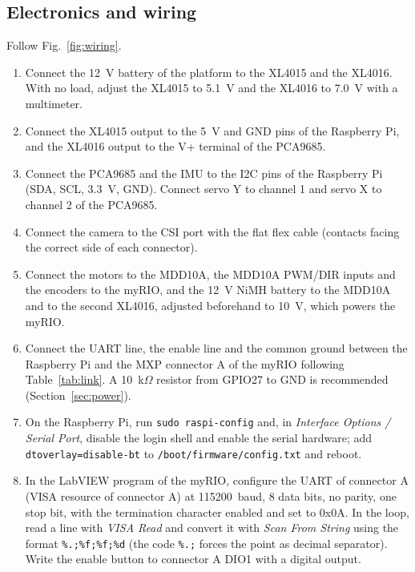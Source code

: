 \documentclass[11pt,letterpaper]{article}
\begin{document}
\subsection{Electronics and wiring}
Follow Fig.~\ref{fig:wiring}.
\begin{enumerate}
    \item Connect the 12~V battery of the platform to the XL4015 and the
    XL4016. With no load, adjust the XL4015 to 5.1~V and the XL4016 to
    7.0~V with a multimeter.
    \item Connect the XL4015 output to the 5~V and GND pins of the
    Raspberry Pi, and the XL4016 output to the V+ terminal of the
    PCA9685.
    \item Connect the PCA9685 and the IMU to the I2C pins of the
    Raspberry Pi (SDA, SCL, 3.3~V, GND). Connect servo Y to channel 1
    and servo X to channel 2 of the PCA9685.
    \item Connect the camera to the CSI port with the flat flex cable
    (contacts facing the correct side of each connector).
    \item Connect the motors to the MDD10A, the MDD10A PWM/DIR inputs and
    the encoders to the myRIO, and the 12~V NiMH battery to the MDD10A and
    to the second XL4016, adjusted beforehand to 10~V, which powers the
    myRIO.
    \item Connect the UART line, the enable line and the common ground
    between the Raspberry Pi and the MXP connector A of the myRIO
    following Table~\ref{tab:link}. A 10~k$\Omega$ resistor from GPIO27 to
    GND is recommended (Section~\ref{sec:power}).
    \item On the Raspberry Pi, run \texttt{sudo raspi-config} and, in
    \textit{Interface Options / Serial Port}, disable the login shell and
    enable the serial hardware; add \texttt{dtoverlay=disable-bt} to
    \texttt{/boot/firmware/config.txt} and reboot.
    \item In the LabVIEW program of the myRIO, configure the UART of
    connector A (VISA resource of connector A) at 115200~baud, 8 data bits,
    no parity, one stop bit, with the termination character enabled and
    set to 0x0A. In the loop, read a line with \textit{VISA Read} and
    convert it with \textit{Scan From String} using the format
    \texttt{\%.;\%f;\%f;\%d} (the code \texttt{\%.;} forces the point as
    decimal separator). Write the enable button to connector A DIO1 with a
    digital output.
\end{enumerate}
\end{document}
